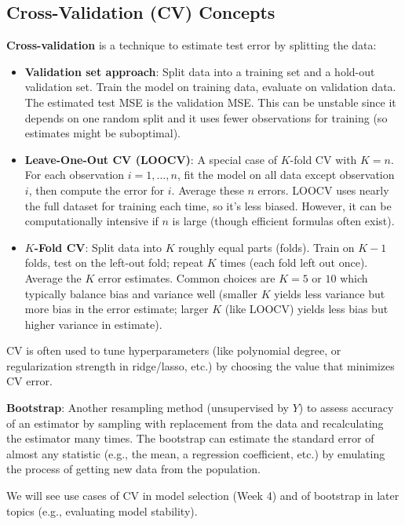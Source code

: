 \documentclass[11pt]{article}
\begin{document}
\subsection{Cross-Validation (CV) Concepts}
\textbf{Cross-validation} is a technique to estimate test error by splitting the data:
\begin{itemize}
  \item \textbf{Validation set approach}: Split data into a training set and a hold-out validation set. Train the model on training data, evaluate on validation data. The estimated test MSE is the validation MSE. This can be unstable since it depends on one random split and it uses fewer observations for training (so estimates might be suboptimal).
  \item \textbf{Leave-One-Out CV (LOOCV)}: A special case of $K$-fold CV with $K=n$. For each observation $i=1,\ldots,n$, fit the model on all data except observation $i$, then compute the error for $i$. Average these $n$ errors. LOOCV uses nearly the full dataset for training each time, so it's less biased. However, it can be computationally intensive if $n$ is large (though efficient formulas often exist). 
  \item \textbf{$K$-Fold CV}: Split data into $K$ roughly equal parts (folds). Train on $K-1$ folds, test on the left-out fold; repeat $K$ times (each fold left out once). Average the $K$ error estimates. Common choices are $K=5$ or $10$ which typically balance bias and variance well (smaller $K$ yields less variance but more bias in the error estimate; larger $K$ (like LOOCV) yields less bias but higher variance in estimate). 
\end{itemize}

CV is often used to tune hyperparameters (like polynomial degree, or regularization strength in ridge/lasso, etc.) by choosing the value that minimizes CV error.

\textbf{Bootstrap}: Another resampling method (unsupervised by $Y$) to assess accuracy of an estimator by sampling with replacement from the data and recalculating the estimator many times. The bootstrap can estimate the standard error of almost any statistic (e.g., the mean, a regression coefficient, etc.) by emulating the process of getting new data from the population.

We will see use cases of CV in model selection (Week 4) and of bootstrap in later topics (e.g., evaluating model stability). 
\end{document}
